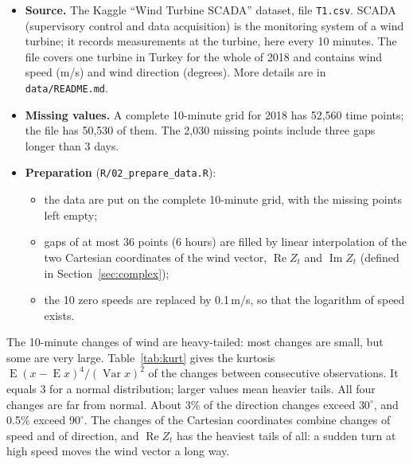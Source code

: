 \documentclass[11pt,a4paper]{article}
\newcommand{\code}[1]{\texttt{#1}}
\DeclareMathOperator{\E}{E}
\renewcommand{\Re}{\operatorname{Re}}
\renewcommand{\Im}{\operatorname{Im}}
\begin{document}
\begin{itemize}
  \item \textbf{Source.} The Kaggle ``Wind Turbine SCADA'' dataset, file \code{T1.csv}. SCADA
    (supervisory control and data acquisition) is the monitoring system of a wind turbine; it
    records measurements at the turbine, here every 10 minutes. The file covers one turbine in
    Turkey for the whole of 2018 and contains wind speed (m/s) and wind direction (degrees).
    More details are in \code{data/README.md}.
  \item \textbf{Missing values.} A complete 10-minute grid for 2018 has 52,560 time points; the
    file has 50,530 of them. The 2,030 missing points include three gaps longer than 3 days.
  \item \textbf{Preparation} (\code{R/02\_prepare\_data.R}):
  \begin{itemize}
    \item the data are put on the complete 10-minute grid, with the missing points left empty;
    \item gaps of at most 36 points (6 hours) are filled by linear interpolation of the two
      Cartesian coordinates of the wind vector, $\Re Z_t$ and $\Im Z_t$ (defined in
      Section~\ref{sec:complex});
    \item the 10 zero speeds are replaced by 0.1\,m/s, so that the logarithm of speed exists.
  \end{itemize}
\end{itemize}

The 10-minute changes of wind are heavy-tailed: most changes are small, but some are very large.
Table~\ref{tab:kurt} gives the kurtosis $\E(x - \E x)^4/(\operatorname{Var} x)^2$ of the changes
between consecutive observations. It equals 3 for a normal distribution; larger values mean
heavier tails. All four changes are far from normal. About 3\% of the direction changes exceed
$30^\circ$, and 0.5\% exceed $90^\circ$. The changes of the Cartesian coordinates combine changes of speed and of direction, and
$\Re Z_t$ has the heaviest tails of all: a sudden turn at high speed moves the wind vector a long way.
\end{document}
